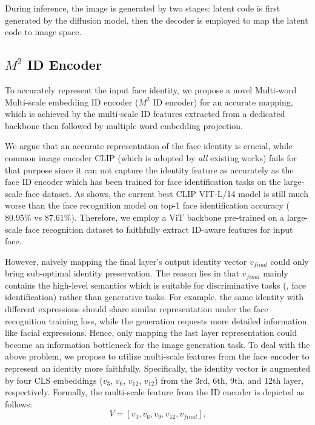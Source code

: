 During inference, the image is generated by two stages: latent code is first generated by the diffusion model, then the decoder is employed to map the latent code to image space. 

\subsection{$M^{2}$ ID Encoder}

To accurately represent the input face identity, we propose a novel Multi-word Multi-scale embedding ID encoder ($M^2$ ID encoder) for an accurate mapping, which is achieved by the multi-scale ID features extracted from a dedicated backbone then followed by multiple word embedding projection.




 We argue that an accurate representation of the face identity is crucial, while common image encoder CLIP (which is adopted by \emph{all} existing works) fails for that purpose since it can not capture the identity feature as accurately as the face ID encoder which has been trained for face identification tasks on the large-scale face dataset. As \cite{bhat2023face} shows, the current best CLIP VIT-L/14 model is still much worse than the face recognition model on top-1 face identification accuracy ($80.95\%$ vs $87.61\%$). Therefore, we employ a ViT backbone \cite{dosovitskiy2020image} pre-trained on a large-scale face recognition dataset to faithfully extract ID-aware features for input face.


  However, naively mapping the final layer's output identity vector $v_{final}$ could only bring sub-optimal identity preservation. The reason lies in that $v_{final}$ mainly contains the high-level semantics which is suitable for discriminative tasks (\eg, face identification) rather than generative tasks. For example, the same identity with different expressions should share similar representation under the face recognition training loss, while the generation requests more detailed information like facial expressions. Hence, only mapping the last layer representation could become an information bottleneck for the image generation task. To deal with the above problem, we propose to utilize multi-scale features from the face encoder to represent an identity more faithfully. Specifically, the identity vector is augmented by four CLS embeddings ($v_3$, $v_6$, $v_{12}$, $v_{12}$) from the 3rd, 6th, 9th, and 12th layer, respectively. Formally, the multi-scale feature from the ID encoder is depicted as follows:
\begin{equation}
V = [v_3, v_6, v_9, v_{12}, v_{final}].
\end{equation}

